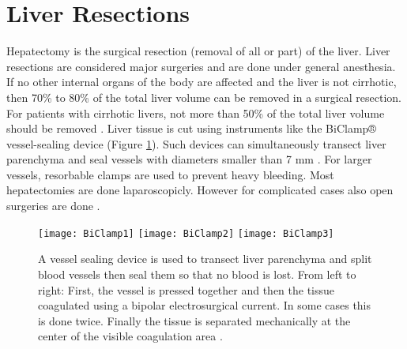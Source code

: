 \section{Liver Resections} 
Hepatectomy is the surgical resection (removal of all or part) of the liver.
Liver resections are considered major surgeries and are done under general
anesthesia. If no other internal organs of the body are affected and the liver
is not cirrhotic, then 70\% to 80\% of the total liver volume can be removed in a
surgical resection. For patients with cirrhotic livers, not more than 50\% of
the total liver volume should be removed \cite{pianka2011liver}. Liver tissue is
cut using instruments like the BiClamp® vessel-sealing device (Figure \ref{fig:BiClampExplained}). Such devices can
simultaneously transect liver parenchyma and seal vessels with diameters smaller
than 7 mm \cite{zhao2017biclamp}. For larger vessels, resorbable clamps are used
to prevent heavy bleeding. Most hepatectomies are done laparoscopicly. However for complicated
cases also open surgeries are done \cite{cherqui2000laparoscopic}.
\begin{figure}[H]
  \centering
  \texttt{[image: BiClamp1]}
  \endminipage
  \hfill
  \texttt{[image: BiClamp2]}
  \endminipage
  \hfill
  \texttt{[image: BiClamp3]}
  \endminipage
  \hfill 
 \caption{A vessel sealing device is used to transect liver parenchyma and split
   blood vessels then seal them so that no blood is lost. From left to right:
   First, the vessel is pressed together and then the tissue coagulated using a bipolar
   electrosurgical current. In some cases this is done twice. Finally the tissue
   is separated mechanically at the center of the visible coagulation area \cite{biClampPdfWithImages}. }
  \label{fig:BiClampExplained}
\end{figure}

